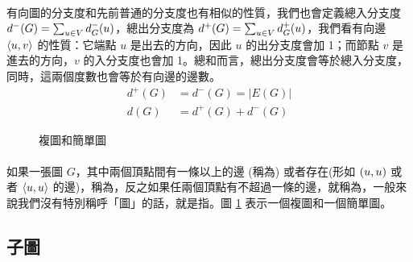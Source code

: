 \documentclass[12pt,a4paper,oneside]{report}
\begin{document}
\begin{CJK}{UTF8}{bkai}
\paragraph{}有向圖的分支度和先前普通的分支度也有相似的性質，我們也會定義總入分支度 $d^{-}{(G)}=\sum_{u\in{V}}{d^{-}_{G}{(u)}}$，總出分支度為 $d^{+}{(G)}=\sum_{u\in{V}}{d^{+}_{G}{(u)}}$，我們看有向邊 $\langle{}{{u},{v}}\rangle{}$ 的性質：它端點 $u$ 是出去的方向，因此 $u$ 的出分支度會加 1；而節點 $v$ 是進去的方向，$v$ 的入分支度也會加 1。總和而言，總出分支度會等於總入分支度，同時，這兩個度數也會等於有向邊的邊數。
\begin{align}
\label{eq:degree_directed}
d^{+}{(G)}&=d^{-}{(G)}=|E(G)|\\
d(G)&=d^{+}{(G)}+d^{-}{(G)}
\end{align}
\begin{figure}[h!]
\centering
{}
\caption{複圖和簡單圖}
\label{fig:multigraph_and_simple}
\end{figure}
\paragraph{}如果一張圖 $G$，其中兩個頂點間有一條以上的邊 (稱為) 或者存在\textbf{}(形如 $({u},{u})$ 或者 $\langle{}{{u},{u}}\rangle{}$ 的邊)，稱為，反之如果任兩個頂點有不超過一條的邊，就稱為\textbf{}，一般來說我們沒有特別稱呼「圖」的話，就是指。圖 \ref{fig:multigraph_and_simple} 表示一個複圖和一個簡單圖。

\subsection{子圖}

\end{CJK}
\end{document}
